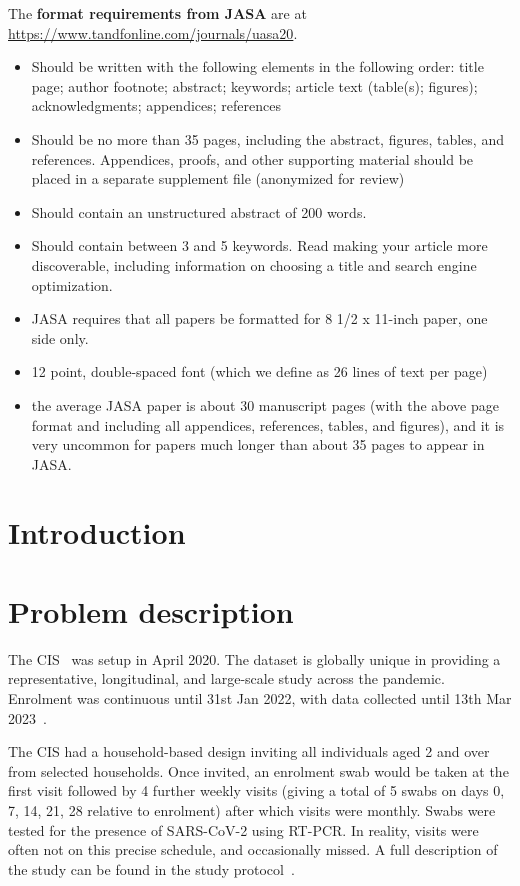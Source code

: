 \documentclass[12pt]{article}
\begin{document}
The \textbf{format requirements from JASA} are at \url{https://www.tandfonline.com/journals/uasa20}.
\begin{itemize}
    \item Should be written with the following elements in the following order: title page; author footnote; abstract; keywords; article text (table(s); figures); acknowledgments; appendices; references
    \item Should be no more than 35 pages, including the abstract, figures, tables, and references. Appendices, proofs, and other supporting material should be placed in a separate supplement file (anonymized for review)
    \item Should contain an unstructured abstract of 200 words.
    \item Should contain between 3 and 5 keywords. Read making your article more discoverable, including information on choosing a title and search engine optimization.
    \item JASA requires that all papers be formatted for 8 1/2 x 11-inch paper, one side only.
    \item 12 point, double-spaced font (which we define as 26 lines of text per page)
    \item the average JASA paper is about 30 manuscript pages (with the above page format and including all appendices, references, tables, and figures), and it is very uncommon for papers much longer than about 35 pages to appear in JASA. 
\end{itemize}

\newpage
{} %
\section{Introduction}
\label{sec:intro}


\section{Problem description}

The CIS~\citep{CIS} was setup in April 2020.
The dataset is globally unique in providing a representative, longitudinal, and large-scale study across the pandemic.
Enrolment was continuous until 31st Jan 2022, with data collected until 13th Mar 2023~\citep{weiRisk}. 

The CIS had a household-based design inviting all individuals aged 2 and over from selected households.
Once invited, an enrolment swab would be taken at the first visit followed by 4 further weekly visits (giving a total of 5 swabs on days 0, 7, 14, 21, 28 relative to enrolment) after which visits were monthly.
Swabs were tested for the presence of SARS-CoV-2 using RT-PCR.
In reality, visits were often not on this precise schedule, and occasionally missed.
A full description of the study can be found in the study protocol~\citep{cisProtocol}.
\end{document}
